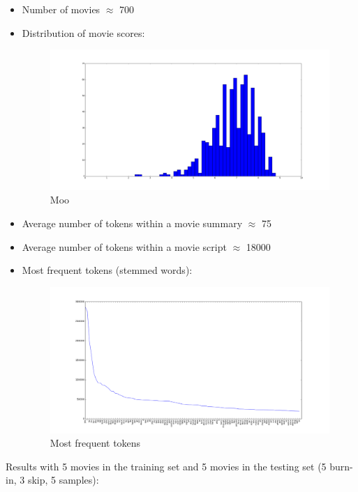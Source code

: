 \documentclass[a4paper,10pt]{report}
\begin{document}
\begin{itemize}
	\item Number of movies $\approx$ 700
	\item Distribution of movie scores:
	
	\begin{figure}[ht!]
		\centering
		\includegraphics[width=\textwidth]{scores_histogram.png}
		
		\caption{Moo}
	\end{figure}

	\item Average number of tokens within a movie summary $\approx$ 75
	\item Average number of tokens within a movie script $\approx$ 18000
	\item Most frequent tokens (stemmed words):
	
	\begin{figure}[ht!]
		\centering
		\includegraphics[width=\textwidth]{most_frequent_tokens_global.png}
		
		\caption{Most frequent tokens}
	\end{figure}
\end{itemize}


Results with 5 movies in the training set and 5 movies in the testing set (5 burn-in, 3 skip, 5 samples):
\end{document}
